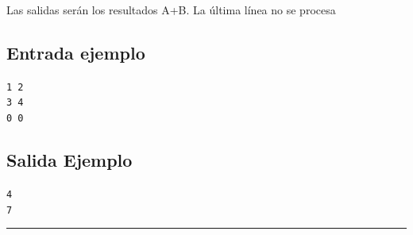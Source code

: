 \documentclass[letter,10pt]{article}
\begin{document}
Las salidas serán los resultados A+B. La última línea no se procesa	

\subsection*{Entrada ejemplo}
\noindent \texttt{1 2}~\\
\texttt{3 4}~\\
\texttt{0 0}~\\
\noindent 

\subsection*{Salida Ejemplo}

\noindent \texttt{4}~\\
\texttt{7}~\\

\noindent \rule[0.5ex]{1\columnwidth}{1pt}
\end{document}
